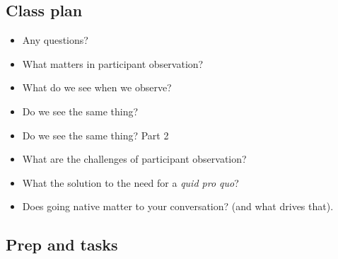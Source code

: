 \documentclass[]{book}
\theoremstyle{definition}
\theoremstyle{definition}
\theoremstyle{definition}
\theoremstyle{remark}
\begin{document}
\hypertarget{class-plan-3}{%
\subsection*{Class plan}\label{class-plan-3}}

\begin{itemize}
\item
  Any questions?
\item
  What matters in participant observation?
\item
  What do we see when we observe?
\item
  Do we see the same thing?
\item
  Do we see the same thing? Part 2
\item
  What are the challenges of participant observation?
\item
  What the solution to the need for a \emph{quid pro quo}?
\item
  Does going native matter to your conversation? (and what drives that).
\end{itemize}

\hypertarget{prep-and-tasks-3}{%
\subsection*{Prep and tasks}\label{prep-and-tasks-3}}
\end{document}
